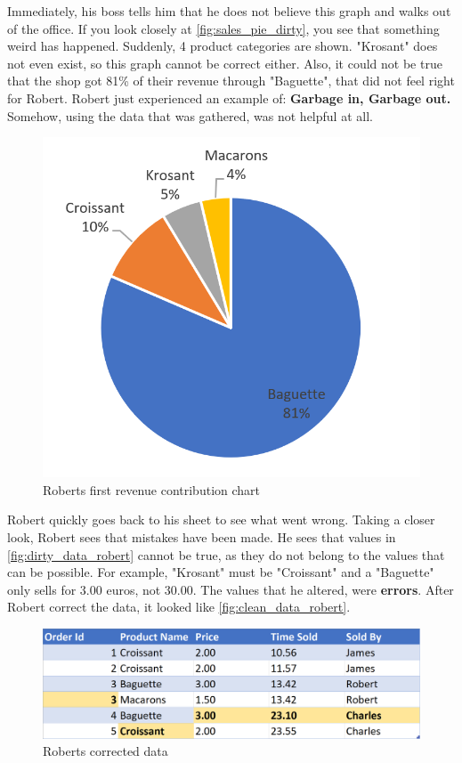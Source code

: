 Immediately, his boss tells him that he does not believe this graph and walks out of the office. 
If you look closely at \autoref{fig:sales_pie_dirty}, you see that something weird has happened. Suddenly, 4 product categories are shown. "Krosant" does not even exist, so this graph cannot be correct either. Also, it could not be true that the shop got 81\% of their revenue through "Baguette", that did not feel right for Robert. Robert just experienced an example of: \textbf{Garbage in, Garbage out.} Somehow, using the data that was gathered, was not helpful at all.

\begin{figure}[h]
    \centering
    \includegraphics[width=0.5\linewidth]{thesis/Figures/Sales_Pie_Dirty.png}
    \caption{Roberts first revenue contribution chart}
    \label{fig:sales_pie_dirty}
\end{figure}

Robert quickly goes back to his sheet to see what went wrong. Taking a closer look, Robert sees that mistakes have been made. He sees that values in \autoref{fig:dirty_data_robert} cannot be true, as they do not belong to the values that can be possible. For example, "Krosant" must be "Croissant" and a "Baguette" only sells for 3.00 euros, not 30.00. The values that he altered, were \textbf{errors}. After Robert correct the data, it looked like \autoref{fig:clean_data_robert}.

\begin{figure}[h]
    \centering
    \includegraphics[width=0.9\linewidth]{thesis/Figures/CleanDataset.png}
    \caption{Roberts corrected data}
    \label{fig:clean_data_robert}
\end{figure}

